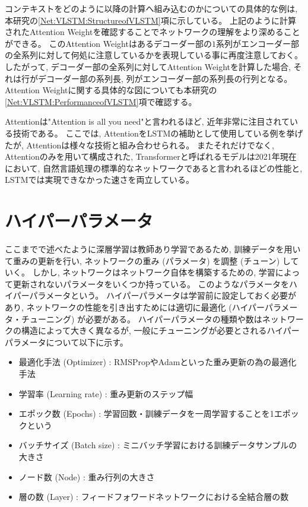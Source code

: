 コンテキストをどのように以降の計算へ組み込むのかについての具体的な例は, 本研究の\ref{Net:VLSTM:StructureofVLSTM}項に示している。
上記のように計算されたAttention Weightを確認することでネットワークの理解をより深めることができる。
このAttention Weightはあるデコーダー部の$1$系列がエンコーダー部の全系列に対して何処に注意しているかを表現している事に再度注意しておく。
したがって, デコーダー部の全系列に対してAttention Weightを計算した場合, それは行がデコーダー部の系列長, 列がエンコーダー部の系列長の行列となる。
Attention Weightに関する具体的な図についても本研究の\ref{Net:VLSTM:PerformanceofVLSTM}項で確認する。

Attentionは"Attention is all you need\cite{AttentionIsAllYouNeed}"と言われるほど, 近年非常に注目されている技術である。
ここでは, AttentionをLSTMの補助として使用している例を挙げたが, Attentionは様々な技術と組み合わせられる。
またそれだけでなく, Attentionのみを用いて構成された, Transformerと呼ばれるモデルは2021年現在において, 自然言語処理の標準的なネットワークであると言われるほどの性能と, LSTMでは実現できなかった速さを両立している。


\section{ハイパーパラメータ} \label{DL:HyperParameter}

ここまでで述べたように深層学習は教師あり学習であるため, 訓練データを用いて重みの更新を行い, ネットワークの重み (パラメータ) を調整 (チューン) していく。
しかし, ネットワークはネットワーク自体を構築するための, 学習によって更新されないパラメータをいくつか持っている。
このようなパラメータをハイパーパラメータという。
ハイパーパラメータは学習前に設定しておく必要があり, ネットワークの性能を引き出すためには適切に最適化 (ハイパーパラメータ・チューニング) が必要がある。
ハイパーパラメータの種類や数はネットワークの構造によって大きく異なるが, 一般にチューニングが必要とされるハイパーパラメータについて以下に示す。

\begin{itemize}
  \item 最適化手法 (Optimizer) : RMSPropやAdamといった重み更新の為の最適化手法
  \item 学習率 (Learning rate) : 重み更新のステップ幅
  \item エポック数 (Epochs) : 学習回数・訓練データを一周学習することを1エポックという
  \item バッチサイズ (Batch size) : ミニバッチ学習における訓練データサンプルの大きさ
  \item ノード数 (Node) : 重み行列の大きさ
  \item 層の数 (Layer) : フィードフォワードネットワークにおける全結合層の数
\end{itemize}


